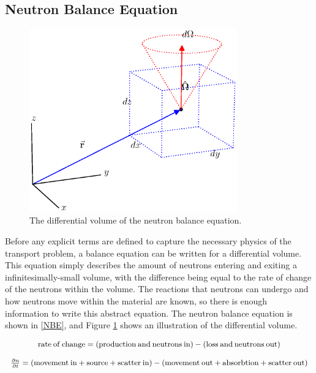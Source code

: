 \subsection{Neutron Balance Equation}

\begin{figure}[h!] 
  \centering
    \includegraphics[width=0.8\textwidth,trim= 0cm 2.5cm 0cm 0cm]{graphics/diff_balance.eps} 
     \caption{The differential volume of the neutron balance equation. \label{diff_volume}}
\end{figure}

Before any explicit terms are defined to capture the necessary physics of the transport problem, a balance equation can be written for a differential volume.  This equation simply describes the amount of neutrons entering and exiting a infinitesimally-small volume, with the difference being equal to the rate of change of the neutrons within the volume.  The reactions that neutrons can undergo and how neutrons move within the material are known, so there is enough information to write this abstract equation.   The neutron balance equation is shown in \eqref{NBE}, and Figure \ref{diff_volume} shows an illustration of the differential volume.

\begin{equation}
\footnotesize
\begin{array}{c}
\mathrm{rate\:of\:change} = (\mathrm{production\:and\:neutrons\:in}) - (\mathrm{loss\:and\:neutrons\:out}) \\
\\
\frac{\partial n}{\partial t} = ( \mathrm{movement\:in} + \mathrm{source} + \mathrm{scatter\:in}) - ( \mathrm{movement\:out} + \mathrm{absorbtion} + \mathrm{scatter\:out})
\end{array}
\label{NBE}
\end{equation}

